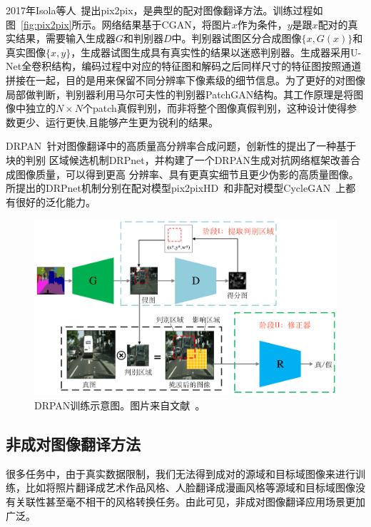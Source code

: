 2017年Isola等人~\cite{isola2017image}提出pix2pix，是典型的配对图像翻译方法。训练过程如图~\ref{fig:pix2pix}所示。网络结果基于CGAN，将图片$x$作为条件，$y$是跟$x$配对的真实结果，需要输入生成器$G$和判别器$D$中。判别器试图区分合成图像$\{x,G(x)\}$和真实图像$\{x,y\}$，生成器试图生成具有真实性的结果以迷惑判别器。生成器采用U-Net全卷积结构，编码过程中对应的特征图和解码之后同样尺寸的特征图按照通道拼接在一起，目的是用来保留不同分辨率下像素级的细节信息。为了更好的对图像局部做判断，判别器利用马尔可夫性的判别器PatchGAN结构。其工作原理是将图像中独立的$N \times N$个patch真假判别，而非将整个图像真假判别，这种设计使得参数更少、运行更快,且能够产生更为锐利的结果。

DRPAN~\cite{wang2019discriminative}针对图像翻译中的高质量高分辨率合成问题，创新性的提出了一种基于块的判别 区域候选机制DRPnet，并构建了一个DRPAN生成对抗网络框架改善合成图像质量，可以得到更高 分辨率、具有更真实细节且更少伪影的高质量图像。所提出的DRPnet机制分别在配对模型pix2pixHD~\cite{wang2018high}和非配对模型CycleGAN~\cite{zhu2017unpaired}上都有很好的泛化能力。

\begin{figure}[ht]
    \centering
	\includegraphics[width=\textwidth]{figures/DRPAN.pdf}
	\caption{DRPAN训练示意图。图片来自文献~\cite{wang2019discriminative}。}
	\label{fig:drpan}
\end{figure}

\subsection{非成对图像翻译方法}
很多任务中，由于真实数据限制，我们无法得到成对的源域和目标域图像来进行训练，比如将照片翻译成艺术作品风格、人脸翻译成漫画风格等源域和目标域图像没有关联性甚至毫不相干的风格转换任务。由此可见，非成对图像翻译应用场景更加广泛。

